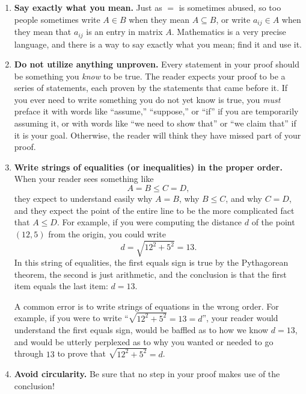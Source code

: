 \begin{enumerate}
\item \textbf{Say exactly what you mean.}
Just as $=$ is sometimes abused, so too people sometimes write $A\in B$ when they mean $A\subseteq B$, or write $a_{ij}\in A$ when they mean that $a_{ij}$ is an entry in matrix $A$. Mathematics is a very precise language, and there is a way to say exactly what you mean; find it and use it.

\item \textbf{Do not utilize anything unproven.}
Every statement in your proof should be something you \emph{know} to be true. The reader expects your proof to be a series of statements, each proven by the statements that came before it. If you ever need to write something you do not yet know is true, you \emph{must} preface it with words like ``assume,'' ``suppose,'' or ``if'' if you are temporarily assuming it, or with words like ``we need to show that'' or ``we claim that'' if it is your goal. Otherwise, the reader will think they have missed part of your proof.

\item \textbf{Write strings of equalities (or inequalities) in the proper order.}
When your reader sees something like
\[
A=B\leq C=D,
\]
they expect to understand easily why $A=B$, why $B\leq C$, and why $C=D$, and they expect the point of the entire line to be the more complicated fact that $A\leq D$. For example, if you were computing the distance $d$ of the point $(12,5)$ from the origin, you could write
\[
d = \sqrt{12^2+5^2} = 13.
\]
In this string of equalities, the first equals sign is true by the Pythagorean theorem, the second is just arithmetic, and the conclusion is that the first item equals the last item: $d=13$.
        
A common error is to write strings of equations in the wrong order. For example, if you were to write ``$\sqrt{12^2+5^2}=13=d$'', your reader would understand the first equals sign, would be baffled as to how we know $d=13$, and would be utterly perplexed as to why you wanted or needed to go through $13$ to prove that $\sqrt{12^2+5^2}=d$.

\item \textbf{Avoid circularity.}  Be sure that no step in your proof makes use of the conclusion!
        

\end{enumerate}
